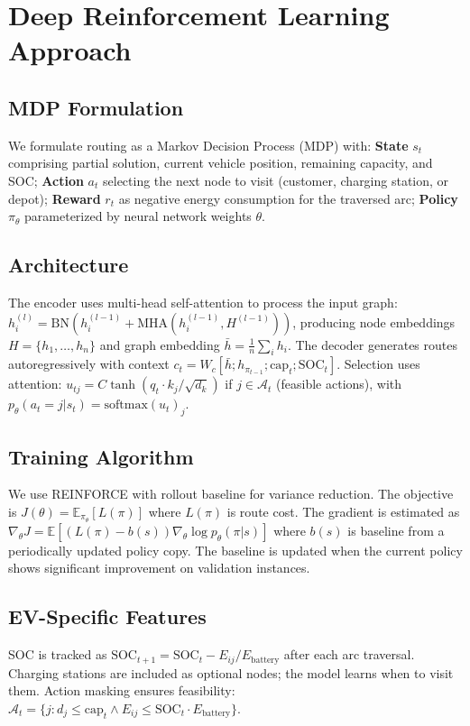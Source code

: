 \documentclass[10pt,a4paper]{article}
\begin{document}
\section{Deep Reinforcement Learning Approach}
\subsection{MDP Formulation}
We formulate routing as a Markov Decision Process (MDP) with: \textbf{State} $s_t$ comprising partial solution, current vehicle position, remaining capacity, and SOC; \textbf{Action} $a_t$ selecting the next node to visit (customer, charging station, or depot); \textbf{Reward} $r_t$ as negative energy consumption for the traversed arc; \textbf{Policy} $\pi_\theta$ parameterized by neural network weights $\theta$.
\subsection{Architecture}
The encoder uses multi-head self-attention to process the input graph: $h_i^{(l)} = \text{BN}(h_i^{(l-1)} + \text{MHA}(h_i^{(l-1)}, H^{(l-1)}))$, producing node embeddings $H = \{h_1,\ldots,h_n\}$ and graph embedding $\bar{h} = \frac{1}{n}\sum_i h_i$. The decoder generates routes autoregressively with context $c_t = W_c[\bar{h}; h_{\pi_{t-1}}; \text{cap}_t; \text{SOC}_t]$. Selection uses attention: $u_{tj} = C\tanh(q_t \cdot k_j/\sqrt{d_k})$ if $j \in \mathcal{A}_t$ (feasible actions), with $p_\theta(a_t=j|s_t) = \text{softmax}(u_t)_j$.
\subsection{Training Algorithm}
We use REINFORCE with rollout baseline for variance reduction. The objective is $J(\theta) = \mathbb{E}_{\pi_\theta}[L(\pi)]$ where $L(\pi)$ is route cost. The gradient is estimated as $\nabla_\theta J = \mathbb{E}[(L(\pi)-b(s))\nabla_\theta\log p_\theta(\pi|s)]$ where $b(s)$ is baseline from a periodically updated policy copy. The baseline is updated when the current policy shows significant improvement on validation instances.
\subsection{EV-Specific Features}
SOC is tracked as $\text{SOC}_{t+1} = \text{SOC}_t - E_{ij}/E_{\text{battery}}$ after each arc traversal. Charging stations are included as optional nodes; the model learns when to visit them. Action masking ensures feasibility: $\mathcal{A}_t = \{j: d_j \leq \text{cap}_t \land E_{ij} \leq \text{SOC}_t \cdot E_{\text{battery}}\}$.
\end{document}
